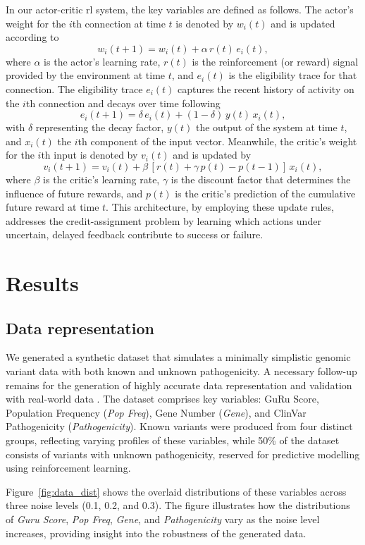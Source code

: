 In our actor-critic \ac{rl} system, the key variables are defined as follows. The actor’s weight for the \(i\)th connection at time \(t\) is denoted by \(w_i(t)\) and is updated according to
\[
w_i(t+1) = w_i(t) + \alpha\, r(t)\, e_i(t),
\]
where \(\alpha\) is the actor’s learning rate, \(r(t)\) is the reinforcement (or reward) signal provided by the environment at time \(t\), and \(e_i(t)\) is the eligibility trace for that connection. The eligibility trace \(e_i(t)\) captures the recent history of activity on the \(i\)th connection and decays over time following
\[
e_i(t+1) = \delta\, e_i(t) + (1-\delta)\, y(t)\, x_i(t),
\]
with \(\delta\) representing the decay factor, \(y(t)\) the output of the system at time \(t\), and \(x_i(t)\) the \(i\)th component of the input vector. Meanwhile, the critic’s weight for the \(i\)th input is denoted by \(v_i(t)\) and is updated by
\[
v_i(t+1) = v_i(t) + \beta\,[r(t) + \gamma\, p(t) - p(t-1)]\, x_i(t),
\]
where \(\beta\) is the critic’s learning rate, \(\gamma\) is the discount factor that determines the influence of future rewards, and \(p(t)\) is the critic’s prediction of the cumulative future reward at time \(t\). This architecture, by employing these update rules, addresses the credit-assignment problem by learning which actions under uncertain, delayed feedback contribute to success or failure.

\section{Results}
\subsection{Data representation}

We generated a synthetic dataset that simulates a minimally simplistic genomic variant data with both known and unknown pathogenicity. 
A necessary follow-up remains for the generation of highly accurate data representation and validation with real-world data .
The dataset comprises key variables: GuRu Score, Population Frequency (\emph{Pop Freq}), Gene Number (\emph{Gene}), and ClinVar Pathogenicity (\emph{Pathogenicity}). Known variants were produced from four distinct groups, reflecting varying profiles of these variables, while 50\% of the dataset consists of variants with unknown pathogenicity, reserved for predictive modelling using reinforcement learning.

Figure~\ref{fig:data_dist} shows the overlaid distributions of these variables across three noise levels (0.1, 0.2, and 0.3). The figure illustrates how the distributions of \emph{Guru Score}, \emph{Pop Freq}, \emph{Gene}, and \emph{Pathogenicity} vary as the noise level increases, providing insight into the robustness of the generated data.

